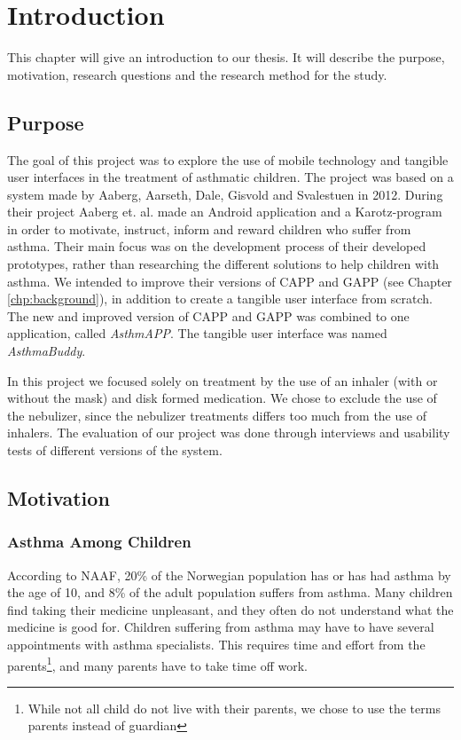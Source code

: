 \chapter{Introduction}
\label{chp:introduction}

This chapter will give an introduction to our thesis. It will describe the purpose, motivation, research questions and the research method for the study. 

\section{Purpose}
\label{sec:purpose}
The goal of this project was to explore the use of mobile technology and tangible user interfaces in the treatment of asthmatic children. The project was based on a system made by Aaberg, Aarseth, Dale, Gisvold and Svalestuen in 2012\cite{CustomerDriven}. During their project Aaberg et. al. made an Android application and a Karotz-program in order to motivate, instruct, inform and reward children who suffer from asthma. Their main focus was on the development process of their developed prototypes, rather than researching the different solutions to help children with asthma.
We intended to improve their versions of CAPP and GAPP (see Chapter \ref{chp:background}), in addition to create a tangible user interface from scratch. The new and improved version of CAPP and GAPP was combined to one application, called \emph{AsthmAPP}. The tangible user interface was named \emph{AsthmaBuddy}. 

In this project we focused solely on treatment by the use of an inhaler (with or without the mask) and disk formed medication. We chose to exclude the use of the nebulizer, since the nebulizer treatments differs too much from the use of inhalers.
The evaluation of our project was done through interviews and usability tests of different versions of the system. 
 

\section{Motivation}
\label{sec:motivation}

\subsection{Asthma Among Children}
According to NAAF, 20\% of the Norwegian population has or has had asthma by the age of 10, and 8\% of the adult population suffers from asthma\cite{NAAFStat}. Many children find taking their medicine unpleasant, and they often do not understand what the medicine is good for. Children suffering from asthma may have to have several appointments with  asthma specialists. This requires time and effort from the parents\footnote{While not all child do not live with their parents, we chose to use the terms parents instead of guardian}, and many parents have to take time off work. 

